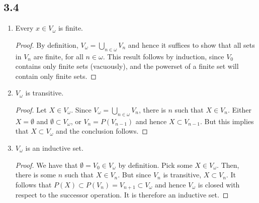 \subsection*{3.4}
\begin{enumerate}
    \item Every $x \in V_{\omega}$ is finite.

    \begin{proof}
        By definition, $V_{\omega} = \bigcup_{n \in \omega} V_n$ and hence it suffices to show that all sets in $V_n$ are finite, for all $n \in \omega$. This result follows by induction, since $V_0$ contains only finite sets (vacuously), and the powerset of a finite set will contain only finite sets.
    \end{proof}

    \item $V_{\omega}$ is transitive.

    \begin{proof}
        Let $X \in V_{\omega}$. Since $V_{\omega} = \bigcup_{n \in \omega} V_n$, there is $n$ such that $X \in V_n$. Either $X = \emptyset$ and $\emptyset \subset V_{\omega}$, or $V_n = P(V_{n-1})$ and hence $X \subset V_{n-1}$. But this implies that $X \subset V_{\omega}$ and the conclusion follows.
    \end{proof}

    \item $V_\omega$ is an inductive set.

    \begin{proof}
        We have that $\emptyset = V_0 \in V_{\omega}$ by definition. Pick some $X \in V_{\omega}$. Then, there is some $n$ such that $X \in V_n$. But since $V_n$ is transitive, $X \subset V_n$. It follows that $P(X) \subset P(V_n) = V_{n+1} \subset V_\omega$ and hence $V_\omega$ is closed with respect to the successor operation. It is therefore an inductive set.
    \end{proof}
\end{enumerate}

